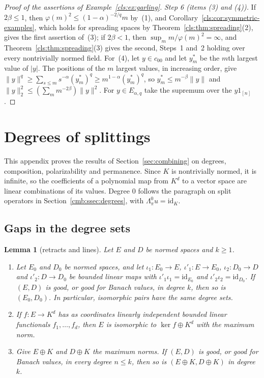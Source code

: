 \documentclass[11pt]{amsart}
\newtheorem{lemma}[theorem]{Lemma}
\theoremstyle{definition}
\theoremstyle{remark}
\numberwithin{equation}{section}
\newcommand{\id}{\mathrm{id}}
\newcommand{\abs}[1]{\lvert #1\rvert}
\newcommand{\norm}[1]{\lVert #1\rVert}
\theoremstyle{plain}
\theoremstyle{definition}
\theoremstyle{plain}
\begin{document}
\begin{proof}[Proof of the assertions of Example~\ref{cls:ex:garling}]
\emph{Step 6 (items (3) and (4)).} If $2\beta\le1$, then $\varphi(m)^2\le(1-\alpha)^{-2/q}m$ by~(1), and
Corollary~\ref{cls:cor:symmetric-examples}, which holds for spreading spaces by Theorem~\ref{cls:thm:spreading}(2), gives
the first assertion of~(3); if $2\beta<1$, then $\sup_mm/\varphi(m)^2=\infty$, and Theorem~\ref{cls:thm:spreading}(3)
gives the second, Steps~1 and~2 holding over every nontrivially normed field. For~(4), let $y\in c_{00}$ and let $y^*_m$
be the $m$th largest value of $\abs y$. The positions of the $m$ largest values, in increasing order, give
$\norm y^q\ge\sum_{s\le m}s^{-\alpha}(y^*_m)^q\ge m^{1-\alpha}(y^*_m)^q$, so $y^*_m\le m^{-\beta}\norm y$ and
$\norm y_2^2\le(\sum_mm^{-2\beta})\norm y^2$. For $y\in E_{\alpha,q}$ take the supremum over the $y1_{[n]}$.
\end{proof}
\section{Degrees of splittings}\label{app:degrees}

This appendix proves the results of Section~\ref{sec:combining} on degrees, composition, polarizability and permanence.
Since $K$ is nontrivially normed, it is infinite, so the coefficients of a polynomial map from $K^d$ to a vector space are
linear combinations of its values. Degree $0$ follows the paragraph on split operators in Section~\ref{cmb:ssec:degrees},
with $\Lambda^0_\pi u=\id_K$.

\subsection{Gaps in the degree sets}\label{dgr:ssec:gaps}

\begin{lemma}[retracts and lines]\label{dgr:lem:lines}
Let $E$ and $D$ be normed spaces and $k\ge1$.
\begin{enumerate}
\item Let $E_0$ and $D_0$ be normed spaces, and let $\iota_1\colon E_0\to E$, $\iota'_1\colon E\to E_0$,
$\iota_2\colon D_0\to D$ and $\iota'_2\colon D\to D_0$ be bounded linear maps with $\iota'_1\iota_1=\id_{E_0}$ and
$\iota'_2\iota_2=\id_{D_0}$. If $(E,D)$ is good, or good for Banach values, in degree $k$, then so is $(E_0,D_0)$. In
particular, isomorphic pairs have the same degree sets.
\item If $f\colon E\to K^d$ has as coordinates linearly independent bounded linear functionals $f_1,\dots,f_d$, then $E$
is isomorphic to $\ker f\oplus K^d$ with the maximum norm.
\item Give $E\oplus K$ and $D\oplus K$ the maximum norms. If $(E,D)$ is good, or good for Banach values, in every degree
$n\le k$, then so is $(E\oplus K,D\oplus K)$ in degree $k$.
\end{enumerate}
\end{lemma}
\end{document}
